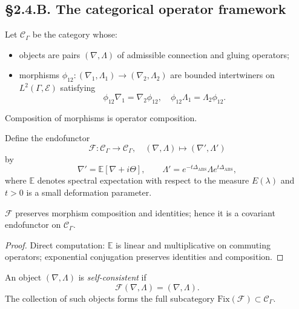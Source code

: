 \subsection*{§2.4.B. The categorical operator framework}

\begin{definition}
Let $\mathcal{C}_\Gamma$ be the category whose:
\begin{itemize}
\item objects are pairs $(\nabla,\Lambda)$ of admissible connection and gluing operators;
\item morphisms $\phi_{12}:(\nabla_1,\Lambda_1)\to(\nabla_2,\Lambda_2)$
are bounded intertwiners on $L^2(\Gamma,\mathcal E)$ satisfying
\[
\phi_{12}\nabla_1 = \nabla_2\phi_{12}, \quad
\phi_{12}\Lambda_1 = \Lambda_2\phi_{12}.
\]
\end{itemize}
Composition of morphisms is operator composition.
\end{definition}

\begin{definition}
Define the endofunctor 
\[
\mathcal{F}:\mathcal{C}_\Gamma\to\mathcal{C}_\Gamma,\quad
(\nabla,\Lambda)\mapsto (\nabla',\Lambda')
\]
by
\[
\nabla' = \mathbb{E}[\nabla+i\Theta],\qquad
\Lambda' = e^{-t\Delta_{\mathrm{ABS}}}\Lambda e^{t\Delta_{\mathrm{ABS}}},
\]
where $\mathbb{E}$ denotes spectral expectation with respect to the measure $E(\lambda)$ and $t>0$ is a small deformation parameter.
\end{definition}

\begin{lemma}[Functoriality]\label{lem:2.4.functor}
$\mathcal{F}$ preserves morphism composition and identities; hence it is a covariant endofunctor on $\mathcal{C}_\Gamma$.
\end{lemma}

\begin{proof}
Direct computation: $\mathbb{E}$ is linear and multiplicative on commuting operators; exponential conjugation preserves identities and composition.
\end{proof}

\begin{definition}
An object $(\nabla,\Lambda)$ is \emph{self-consistent} if
\[
\mathcal{F}(\nabla,\Lambda)=(\nabla,\Lambda).
\]
The collection of such objects forms the full subcategory $\mathrm{Fix}(\mathcal{F})\subset\mathcal{C}_\Gamma$.
\end{definition}

